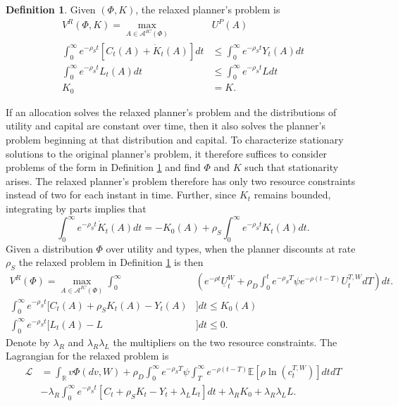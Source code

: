 \documentclass[11pt]{article}
\theoremstyle{plain}
\theoremstyle{definition} %
\newtheorem{defn}{Definition}[section]
\begin{document}
\begin{defn}\label{RELAXplanprob} 
Given $(\Phi,K)$, the relaxed planner's problem is 
\begin{align*}
V^R(\Phi,K) = \max_{A \in \mathcal{A}^{IC}(\Phi)} & U^P(A)
\\ \int_0^{\infty} e^{-\rho_S t}[C_t(A) + \dot{K}_t(A)]dt & \leq \int_0^{\infty} e^{-\rho_S t}Y_t(A)dt
\\ \int_0^{\infty} e^{-\rho_S t}L_t(A)dt & \leq \int_0^{\infty} e^{-\rho_S t}Ldt 
\\ K_0 & = K.
\end{align*}
\end{defn} %
If an allocation solves the relaxed planner's problem and the distributions of utility and capital are constant over time, then it also solves the planner's problem beginning at that distribution and capital. To characterize stationary solutions to the original planner's problem, it therefore suffices to consider problems of the form in Definition \ref{RELAXplanprob} and find $\Phi$ and $K$ such that stationarity arises. The relaxed planner's problem therefore has only two resource constraints instead of two for each instant in time. Further, since $K_t$ remains bounded, integrating by parts implies that
$$
\int_0^{\infty}e^{-\rho_S t}\dot{K}_t(A)dt = -K_0(A) + \rho_S \int_{0}^{\infty}e^{-\rho_S t}K_t(A)dt. 
$$ 
Given a distribution $\Phi$ over utility and types, when the planner discounts at rate $\rho_S$ the relaxed problem in Definition \ref{RELAXplanprob} is then 
\begin{align*}
V^R(\Phi) = \max_{A \in \mathcal{A}^{IC}(\Phi)} \int_0^{\infty} & {\left(e^{-\rho t}\underline{U}^W_t + \rho_D \int_0^te^{-\rho_S T}\psi e^{-\rho  (t-T)} U^{T,W}_tdT\right)}dt.
\\ \int_0^{\infty} e^{-\rho_S t}[C_t(A) + \rho_SK_t(A) - Y_t(A)&]dt \leq K_0(A)
\\ \int_0^{\infty} e^{-\rho_S t}[L_t(A)-L&]dt \leq 0. 
\end{align*} 
Denote by $\lambda_R$ and $\lambda_R\lambda_L$ the multipliers on the two resource constraints. The Lagrangian for the relaxed problem is
\begin{align*}
\mathcal{L} & = \int_{\mathbb{R}} v\Phi(dv,W) + \rho_D\int_0^{\infty}e^{-\rho_ST} \psi \int_T^{\infty}e^{-\rho (t-T)} \mathbb{E} [\rho \ln(c^{T,W}_t)]dt dT
\\ & - \lambda_R \int_0^{\infty} e^{-\rho_S t}[C_t + \rho_SK_t - Y_t + \lambda_LL_t]dt + \lambda_RK_0 + \lambda_R\lambda_LL.
\end{align*}
\end{document}
